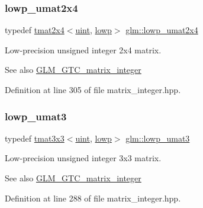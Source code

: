 \subsubsection{\texorpdfstring{lowp\_umat2x4}{lowp\_umat2x4}}
{\footnotesize\ttfamily typedef \mbox{\hyperlink{structglm_1_1tmat2x4}{tmat2x4}}$<$\mbox{\hyperlink{group__core__precision_ga4fd29415871152bfb5abd588334147c8}{uint}}, \mbox{\hyperlink{namespaceglm_a0f04f086094c747d227af4425893f545ae161af3fc695e696ce3bf69f7332bc2d}{lowp}}$>$ \mbox{\hyperlink{group__gtc__matrix__integer_gad5e8f08c103d5dd33767e31938357aa6}{glm\+::lowp\+\_\+umat2x4}}}

Low-\/precision unsigned integer 2x4 matrix. \begin{DoxySeeAlso}{See also}
\mbox{\hyperlink{group__gtc__matrix__integer}{G\+L\+M\+\_\+\+G\+T\+C\+\_\+matrix\+\_\+integer}} 
\end{DoxySeeAlso}


Definition at line 305 of file matrix\+\_\+integer.\+hpp.

\mbox{\label{group__gtc__matrix__integer_ga71b66cc4f5e2d30b64ec99425562a6b6}} 
\subsubsection{\texorpdfstring{lowp\_umat3}{lowp\_umat3}}
{\footnotesize\ttfamily typedef \mbox{\hyperlink{structglm_1_1tmat3x3}{tmat3x3}}$<$\mbox{\hyperlink{group__core__precision_ga4fd29415871152bfb5abd588334147c8}{uint}}, \mbox{\hyperlink{namespaceglm_a0f04f086094c747d227af4425893f545ae161af3fc695e696ce3bf69f7332bc2d}{lowp}}$>$ \mbox{\hyperlink{group__gtc__matrix__integer_ga71b66cc4f5e2d30b64ec99425562a6b6}{glm\+::lowp\+\_\+umat3}}}

Low-\/precision unsigned integer 3x3 matrix. \begin{DoxySeeAlso}{See also}
\mbox{\hyperlink{group__gtc__matrix__integer}{G\+L\+M\+\_\+\+G\+T\+C\+\_\+matrix\+\_\+integer}} 
\end{DoxySeeAlso}


Definition at line 288 of file matrix\+\_\+integer.\+hpp.

\mbox{\label{group__gtc__matrix__integer_ga3ea8482ddaa10befe8dc2d681d86bb59}} 
